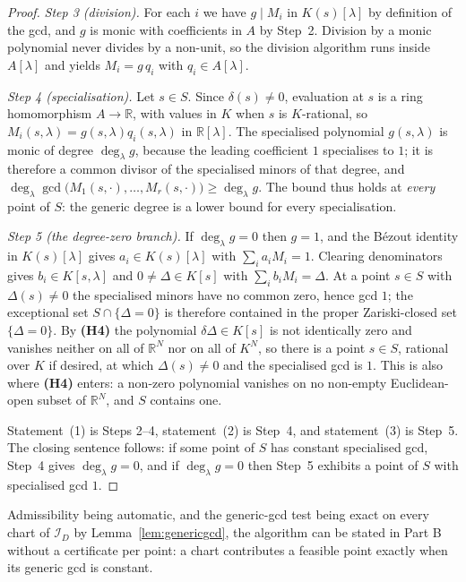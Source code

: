 \documentclass[journal]{IEEEtran}
\theoremstyle{plainn}
\theoremstyle{remark}
\begin{document}
\begin{proof}
\emph{Step 3 (division).} For each $i$ we have $g\mid M_i$ in $K(s)[\lambda]$ by definition of the gcd, and
$g$ is monic with coefficients in $A$ by Step~2. Division by a monic polynomial never divides by a non-unit,
so the division algorithm runs inside $A[\lambda]$ and yields $M_i=g\,q_i$ with $q_i\in A[\lambda]$.

\emph{Step 4 (specialisation).} Let $s\in S$. Since $\delta(s)\neq0$, evaluation at $s$ is a ring
homomorphism $A\to\mathbb R$, with values in $K$ when $s$ is $K$-rational, so
$M_i(s,\lambda)=g(s,\lambda)q_i(s,\lambda)$ in $\mathbb R[\lambda]$. The specialised
polynomial $g(s,\lambda)$ is monic of degree $\deg_\lambda g$, because the leading coefficient $1$
specialises to $1$; it is therefore a common divisor of the specialised minors of that degree, and
$\deg_\lambda\gcd\bigl(M_1(s,\cdot),\dots,M_r(s,\cdot)\bigr)\ge\deg_\lambda g$. The bound thus holds at
\emph{every} point of $S$: the generic degree is a lower bound for every specialisation.

\emph{Step 5 (the degree-zero branch).} If $\deg_\lambda g=0$ then $g=1$, and the B\'ezout identity in
$K(s)[\lambda]$ gives $a_i\in K(s)[\lambda]$ with $\sum_i a_iM_i=1$. Clearing denominators gives
$b_i\in K[s,\lambda]$ and $0\neq\Delta\in K[s]$ with $\sum_i b_iM_i=\Delta$. At a point $s\in S$ with
$\Delta(s)\neq0$ the specialised minors have no common zero, hence gcd $1$; the exceptional set
$S\cap\{\Delta=0\}$ is therefore contained in the proper Zariski-closed set $\{\Delta=0\}$. By \textbf{(H4)}
the polynomial $\delta\Delta\in K[s]$ is not identically zero and vanishes neither on all of
$\mathbb R^N$ nor on all of $K^N$, so there is a point $s\in S$, rational over $K$ if desired, at which
$\Delta(s)\neq0$ and the specialised gcd is $1$. This is also where \textbf{(H4)} enters: a non-zero
polynomial vanishes on no non-empty Euclidean-open subset of $\mathbb R^N$, and $S$ contains one.

Statement~(1) is Steps 2--4, statement~(2) is Step~4, and statement~(3) is Step~5. The closing sentence
follows: if some point of $S$ has constant specialised gcd, Step~4 gives $\deg_\lambda g=0$, and if
$\deg_\lambda g=0$ then Step~5 exhibits a point of $S$ with specialised gcd $1$.
\end{proof}

Admissibility being automatic, and the generic-gcd test being exact on every chart of $\mathcal I_D$ by
Lemma~\ref{lem:genericgcd}, the algorithm can be stated in Part B without a certificate per point: a chart
contributes a feasible point exactly when its generic gcd is constant.
\end{document}
